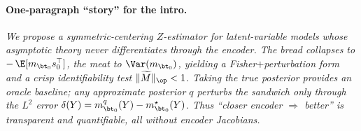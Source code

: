 \paragraph{One-paragraph “story” for the intro.}
\emph{We propose a symmetric-centering $Z$-estimator for latent-variable models whose asymptotic theory never differentiates through the encoder. The bread collapses to $-\,\E[m_{\bt_0}s_0^\top]$, the meat to $\Var(m_{\bt_0})$, yielding a Fisher\(+\)perturbation form and a crisp identifiability test $\|\widetilde M\|_{\op}<1$. Taking the \emph{true} posterior provides an oracle baseline; any approximate posterior $q$ perturbs the sandwich only through the $L^2$ error $\delta(Y)=m^q_{\bt_0}(Y)-m^\star_{\bt_0}(Y)$. Thus “closer encoder $\Rightarrow$ better” is transparent and quantifiable, all without encoder Jacobians.}
